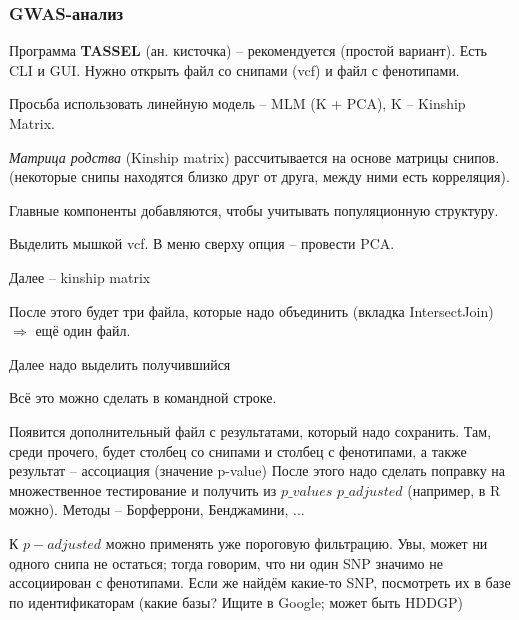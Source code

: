 \documentclass[main.tex]{subfiles}
\begin{document}
\subsubsection{GWAS-анализ}

Программа \textbf{TASSEL} (ан. кисточка) -- рекомендуется (простой вариант).
Есть CLI и GUI.
Нужно открыть файл со снипами (vcf) и файл с фенотипами.

Просьба использовать линейную модель -- MLM (K + PCA), K -- Kinship Matrix.

\emph{Матрица родства} (Kinship matrix) рассчитывается на основе матрицы снипов.
(некоторые снипы находятся близко друг от друга, между ними есть корреляция).

Главные компоненты добавляются, чтобы учитывать популяционную структуру.

\begin{leftbar}
	Выделить мышкой vcf.
	В меню сверху опция -- провести PCA.
	
	Далее -- kinship matrix
	
	После этого будет три файла, которые надо объединить (вкладка IntersectJoin) $ \Rightarrow $ ещё один файл.
	
	Далее надо выделить получившийся
\end{leftbar}
Всё это можно сделать в командной строке.

Появится дополнительный файл с результатами, который надо сохранить.
Там, среди прочего, будет столбец со снипами и столбец с фенотипами, а также результат -- ассоциация (значение p-value)
После этого надо сделать поправку на множественное тестирование и получить из  $ p\_values$ $ p\_adjusted $ (например, в R можно).
Методы -- Борферрони, Бенджамини, ...

К $ p-adjusted $ можно применять уже пороговую фильтрацию.
Увы, может ни одного снипа не остаться; тогда говорим, что ни один SNP значимо не ассоциирован с фенотипами.
Если же найдём какие-то SNP, посмотреть их в базе по идентификаторам (какие базы? Ищите в Google; может быть HDDGP)
\end{document}

